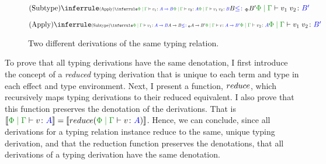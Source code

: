 \documentclass{Report}
\begin{document}
\begin{figure}[H]
\begin{framed}
        \centering
            \begin{minipage}{0.47\textwidth}
                \centering
                \begin{equation*}
                    \scalebox{.9}{$                    \ntreeruleII{\vsubtype}{
                        \scalebox{.6}{$
                        \ntreeruleII{\vapply}{\gpetyperelation{v_1}{\ab}}{\gpetyperelation{v_2}{A}}{\gpetyperelation{\apply{v_1}{v_2}}{B}}
                        $}
                    }{
                        \scalebox{.9}{$B\subtypep B'$}
                    }{
                        \gpetyperelation{\apply{v_1}{v_2}}{B'}
                    }
                    $}
                \end{equation*}
            \end{minipage}
            \quad
            \begin{minipage}{0.47\textwidth}
                \centering

                \begin{equation*}
                    \scalebox{.9}{$
                    \ntreeruleII{\vapply}{
                        \scalebox{.6}{$
                        \ntreeruleII{\vsubtype}{\gpetyperelation{v_1}{\ab}}{\ab\subtypep \fntype{A}{B'}}{\gpetyperelation{v}{\fntype{A}{B'}}}
                        $}
                    }{
                        \scalebox{.7}{$\gpetyperelation{v_2}{A}$}
                    }{
                        \gpetyperelation{\apply{v_1}{v_2}}{B'}
                    }$}
                \end{equation*}
            \end{minipage}
\end{framed}
    \caption{Two different derivations of the same typing relation.}
    \label{NonUniqueDerivations}
\end{figure}

To prove that all typing derivations have the same denotation, I first introduce the concept of a \textit{reduced} typing derivation that is unique to each term and type in each effect and type environment. Next, I present a function, $reduce$, which recursively maps  typing derivations to their reduced equivalent. I also prove that this function preserves the denotation of the derivations. That is $\deno{\gpetyperelation{v}{A}} = \deno{\reduce(\gpetyperelation{v}{A})}$. Hence, we can conclude, since all derivations for a typing relation instance reduce to the same, unique typing derivation, and that the reduction function preserves the denotations, that all derivations of a typing derivation have the same denotation.
\end{document}
